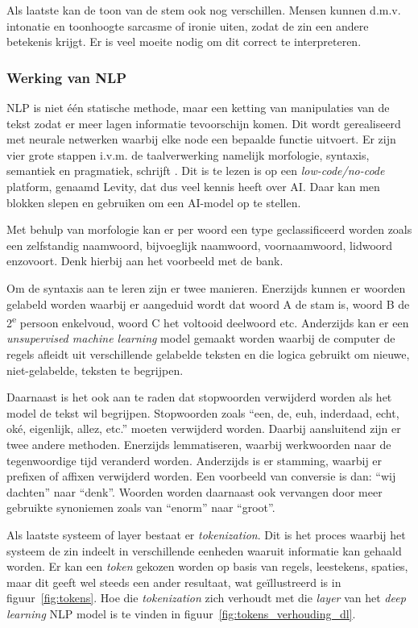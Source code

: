{Als laatste kan de toon van de stem ook nog verschillen. Mensen kunnen d.m.v. intonatie en toonhoogte sarcasme of ironie uiten, zodat de zin een andere betekenis krijgt. Er is veel moeite nodig om dit correct te interpreteren.

\subsubsection{Werking van NLP}
NLP is niet één statische methode, maar een ketting van manipulaties van de tekst zodat er meer lagen informatie tevoorschijn komen. Dit wordt gerealiseerd met neurale netwerken waarbij elke node een bepaalde functie uitvoert.
Er zijn vier grote stappen i.v.m. de taalverwerking namelijk morfologie, syntaxis, semantiek en pragmatiek, schrijft \textcite{Kleinings2022}. Dit is te lezen is op een \textit{low-code/no-code} platform, genaamd Levity, dat dus veel kennis heeft over AI. Daar kan men blokken slepen en gebruiken om een AI-model op te stellen.

Met behulp van morfologie kan er per woord een type geclassificeerd worden zoals een zelfstandig naamwoord, bijvoeglijk naamwoord, voornaamwoord, lidwoord enzovoort. Denk hierbij aan het voorbeeld met de bank.

Om de syntaxis aan te leren zijn er twee manieren. Enerzijds kunnen er woorden gelabeld worden waarbij er aangeduid wordt dat woord A de stam is, woord B de 2\textsuperscript{e} persoon enkelvoud, woord C het voltooid deelwoord etc. Anderzijds kan er een \textit{unsupervised machine learning} model gemaakt worden waarbij de computer de regels afleidt uit verschillende gelabelde teksten en die logica gebruikt om nieuwe, niet-gelabelde, teksten te begrijpen.

Daarnaast is het ook aan te raden dat stopwoorden verwijderd worden als het model de tekst wil begrijpen. Stopwoorden zoals ``een, de, euh, inderdaad, echt, oké, eigenlijk, allez, etc.'' moeten verwijderd worden. Daarbij aansluitend zijn er twee andere methoden. Enerzijds lemmatiseren, waarbij  werkwoorden naar de tegenwoordige tijd veranderd worden.
Anderzijds is er stamming, waarbij er prefixen of affixen verwijderd worden. Een voorbeeld van conversie is dan: ``wij dachten'' naar ``denk''. Woorden worden daarnaast ook vervangen door meer gebruikte synoniemen zoals van ``enorm'' naar ``groot''.

Als laatste systeem of layer bestaat er \textit{tokenization}. Dit is het proces waarbij het systeem de zin indeelt in verschillende eenheden waaruit informatie kan gehaald worden.
Er kan een \textit{token} gekozen worden op basis van regels, leestekens, spaties, maar dit geeft wel steeds een ander resultaat, wat geïllustreerd is in figuur~\ref{fig:tokens}. Hoe die \textit{tokenization} zich verhoudt met die \textit{layer} van het \textit{deep learning} NLP model is te vinden in figuur~\ref{fig:tokens_verhouding_dl}.

}
